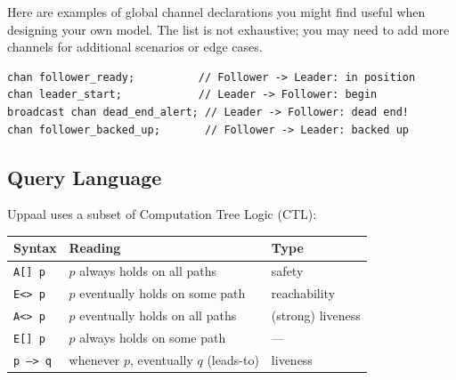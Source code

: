 \documentclass[11pt, a4paper]{article}
\begin{document}

Here are examples of global channel declarations you might find useful when designing your own model. The list is not exhaustive; you may need to add more channels for additional scenarios or edge cases.
\begin{lstlisting}[style=uppaalcode, caption={Global declarations in leader\_follower.xml.}]
chan follower_ready;          // Follower -> Leader: in position
chan leader_start;            // Leader -> Follower: begin
broadcast chan dead_end_alert; // Leader -> Follower: dead end!
chan follower_backed_up;       // Follower -> Leader: backed up
\end{lstlisting}


\subsection{Query Language}

Uppaal uses a subset of Computation Tree Logic (CTL):

\begin{center}
\begin{tabular}{lll}
\toprule
\textbf{Syntax} & \textbf{Reading} & \textbf{Type} \\
\midrule
\texttt{A[] p}   & $p$ always holds on all paths & safety \\
\texttt{E<> p}   & $p$ eventually holds on some path & reachability \\
\texttt{A<> p}   & $p$ eventually holds on all paths & (strong) liveness \\
\texttt{E[] p}   & $p$ always holds on some path & — \\
\texttt{p --> q} & whenever $p$, eventually $q$ (leads-to) & liveness \\
\bottomrule
\end{tabular}
\end{center}
\end{document}
